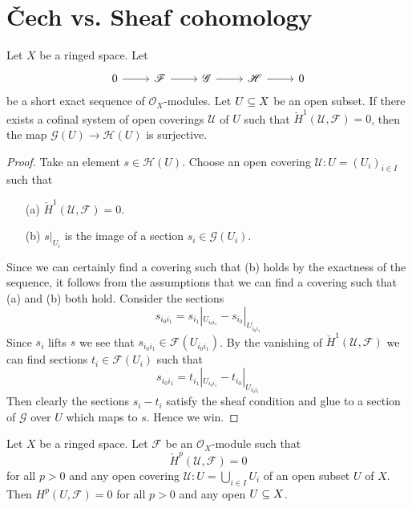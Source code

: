 \section{\v{C}ech vs. Sheaf cohomology}
\begin{proposition}\label{Cech exact section}
Let $X$ be a ringed space. Let
\[\begin{tikzcd}
0\ar[r]&\mathscr{F}\ar[r]&\mathscr{G}\ar[r]&\mathscr{H}\ar[r]&0
\end{tikzcd}\]
be a short exact sequence of $\mathscr{O}_X$-modules. Let $U\subseteq X$ be an open subset. If there exists a cofinal system of open coverings $\mathcal{U}$ of $U$ such that 
$\check{H}^1(\mathcal{U},\mathscr{F})=0$, then the map $\mathscr{G}(U)\to\mathscr{H}(U)$ is surjective.
\end{proposition}
\begin{proof}
Take an element $s\in\mathscr{H}(U)$. Choose an open covering $\mathcal{U}:U=(U_i)_{i\in I}$ such that 
\begin{itemize}
\item[(a)] $\check{H}^1(\mathcal{U},\mathscr{F})=0$.
\item[(b)] $s|_{U_i}$ is the image of a section $s_i\in\mathscr{G}(U_i)$.
\end{itemize} 
Since we can certainly find a covering such that (b) holds by the exactness of the sequence, it follows from the assumptions that we can find a covering such that (a) and (b) both hold. Consider the sections
\[s_{i_0i_1}=s_{i_1}|_{U_{i_0i_1}}-s_{i_0}|_{U_{i_0i_1}}\]
Since $s_i$ lifts $s$ we see that $s_{i_0i_1}\in\mathscr{F}(U_{i_0i_1})$. By the vanishing of $\check{H}^1(\mathcal{U},\mathscr{F})$ we can find sections $t_i\in\mathscr{F}(U_i)$ such that
\[s_{i_0i_1}=t_{i_1}|_{U_{i_0i_1}}-t_{i_0}|_{U_{i_0i_1}}\]
Then clearly the sections $s_i-t_i$ satisfy the sheaf condition and glue to a section of $\mathscr{G}$ over $U$ which maps to $s$. Hence we win.
\end{proof}
\begin{proposition}\label{Cech vanish H^p vanish}
Let $X$ be a ringed space. Let $\mathscr{F}$ be an $\mathcal{O}_X$-module such that
\[\check{H}^p(\mathcal{U},\mathscr{F})=0\]
for all $p>0$ and any open covering $\mathcal{U}:U=\bigcup_{i\in I}U_i$ of an open subset $U$ of $X$. Then $H^p(U,\mathscr{F})=0$ for all $p>0$ and any open $U\subseteq X$.
\end{proposition}
